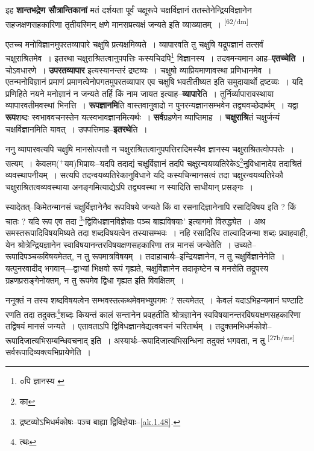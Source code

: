 \documentclass[article,12pt,a4paper]{memoir}
\newcommand{\add}[1]{($^{+}$#1)}
\begin{document}
	  \pstart इह \textbf{शान्तभद्रेण सौत्रान्तिकानां} मतं दर्शयता पूर्वं चक्षूरूपे चक्षर्विज्ञानं ततस्तेनेन्द्रियविज्ञानेन सहजक्षणसहकारिणा तृतीयस्मिन् क्षणे मानसप्रत्यक्षं जन्यते इति व्याख्यातम् ।  \leavevmode\textsuperscript{\rmlatinfont\tiny [62/dm]} 
	  
	एतच्च मनोविज्ञानमुपरतव्यापारे चक्षुषि प्रत्यक्षमिव्यते । व्यापारवति तु चक्षुषि यद्रूपज्ञानं तत्सर्वं चक्षुराश्रितमेव । इतरथा चक्षुराश्रितत्वानुपपत्तिः कस्यचिदपि\footnote{०पि ज्ञानस्य \cite{dp-msB} \cite{dp-msD}} विज्ञानस्य । तदवमन्यमान आह--\textbf{एतच्चेति} । चोऽवधारणे । \textbf{उपरतव्यापार} इत्यस्यानन्तरं द्रष्टव्यः । चक्षुषो व्याप्रियमाणावस्था प्रणिधानमेव । एतन्मनोविज्ञानं प्रमाणं प्रमाणत्वेनोपगतमुपरतव्यापार एव चक्षुषि भवतीतीष्यत इति समुदायार्थो द्रष्टव्यः । यदि प्रणिहिते नयने मनोज्ञानं न जन्यते तर्हि किं नाम जायत इत्याह--\textbf{व्यापारे}ति । तुर्निर्व्यापारावस्थाया व्यापारवतीमवस्थां भिनत्ति । \textbf{रूपज्ञानमि}ति वास्तवानुवादो न पुनरन्यज्ञानसम्भवेन तद्व्यवच्छेदार्थम् । यद्वा \textbf{रूप}शब्दः स्वभाववचनस्तेन यत्स्वभावज्ञानमित्यर्थः । \textbf{सर्व}ग्रहणेन व्याप्तिमाह । \textbf{चक्षुराश्रि}तं चक्षुर्जन्यं चक्षर्विज्ञानमिति यावत् । उपपत्तिमाह--\textbf{इतरथे}ति ।
	\pend
      

	  \pstart ननु व्यापारवत्यपि चक्षुषि मानसोत्पत्तौ न चक्षुराश्रितत्वानुपपत्तिरादिमस्यैव ज्ञानस्य चक्षुराश्रितत्वोपपत्तेः । सत्यम् । केवलम\add{यम}भिप्रायः--यदपि तदाद्यं चक्षुर्विज्ञानं तदपि चक्षुरन्वयव्यतिरेकेऽ\footnote{का}नुविधानादेव तदाश्रितं व्यवस्थापनीयम् । सत्यपि तदन्वयव्यतिरेकानुविधाने यदि कस्यचिन्मानसत्वं तदा चक्षुरन्वयव्यतिरेकौ चक्षुराश्रितत्वव्यवस्थाया अनङ्गमित्याद्येऽपि तद्व्यवस्था न स्यादिति साधीयान् प्रसङ्गः ।
	\pend
      

	  \pstart स्यादेतत्--किमेतन्मानसं चक्षुर्विज्ञानेनैव रूपविषये जन्यते किं वा रसनादिज्ञानेनापि रसादिविषय इति ? किं चातः ? यदि रूप एव तदा \footnote{द्रष्टव्योऽभिधर्मकोषः--पञ्च बाह्या द्विविज्ञेयाः--\cref{ak.1.48}.}‘द्विविधज्ञानविज्ञेयाः पञ्च बाह्यविषयाः’ इत्यागमो विरुद्ध्येत । अथ समस्तरूपादिविषयमिष्यते तदा शब्दविषयत्वेन तस्यासम्भवः । नहि रसादिरिव ताल्वादिजन्मा शब्दः प्रवाहवाही, येन श्रोत्रेन्द्रियज्ञानेन स्वाविषयानन्तरविषयक्षणसहकारिणा तत्र मानसं जन्येतेति । उच्यते--रूपादिपञ्चकविषयमेतत्, न तु रूपमात्रविषयम् । तदाहाचार्यः--इन्द्रियज्ञानेन, न तु चक्षुर्विज्ञानेनेति । यत्पुनरवादीद् भगवान्—द्वाभ्यां भिक्षवो रूपं गृह्यते, चक्षुर्विज्ञानेन तदाकृष्टेन च मनसेति तद्रूपस्य ग्रहणप्रसङ्गेनोक्तम्, न तु रूपमेव द्विधा गृह्यत इति विवक्षितम् ।
	\pend
      

	  \pstart ननूक्तं न तस्य शब्दविषयत्वेन सम्भवस्तत्कथमेवमभ्युपगमः ? सत्यमेतत् । केवलं यदाऽभिहन्यमानं घण्टाटि रणति तदा तदुक्तः\footnote{त्थः}शब्दः कियन्तं कालं सन्तानेन प्रवहतीति श्रोत्रज्ञानेन स्वविषयानन्तरविषयक्षणसहकारिणा तद्विषयं मानसं जन्यते । एतावताऽपि द्विविधज्ञानवेद्यत्ववचनं चरितार्थम् । तदुक्तमभिधर्मकोशे--रूपादिजात्यभिसम्बन्धिवचनाद् इति । अस्यार्थः--रूपादिजात्यभिसन्धिना तदुक्तं भगवता, न तु \leavevmode\textsuperscript{\rmlatinfont\tiny [27b/ms]} सर्वरूपादिव्यक्त्यभिप्रायेणेति ।
	\pend
      
\end{document}
